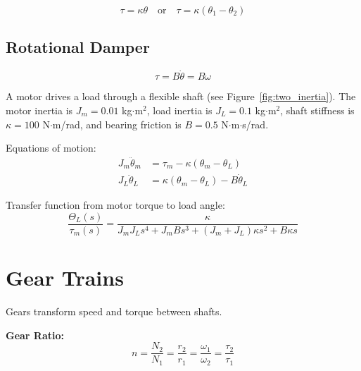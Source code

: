 \begin{equation}
\tau = \kappa\theta \quad \text{or} \quad \tau = \kappa(\theta_1 - \theta_2)
\end{equation}

\subsection{Rotational Damper}

\begin{equation}
\tau = B\dot{\theta} = B\omega
\end{equation}



\begin{examplebox}[title=Example 1.4: Rotating Shaft System]
A motor drives a load through a flexible shaft (see Figure~\ref{fig:two_inertia}). The motor inertia is $J_m = 0.01$ kg$\cdot$m$^2$, load inertia is $J_L = 0.1$ kg$\cdot$m$^2$, shaft stiffness is $\kappa = 100$ N$\cdot$m/rad, and bearing friction is $B = 0.5$ N$\cdot$m$\cdot$s/rad.

Equations of motion:
\begin{align}
J_m\ddot{\theta}_m &= \tau_m - \kappa(\theta_m - \theta_L) \\
J_L\ddot{\theta}_L &= \kappa(\theta_m - \theta_L) - B\dot{\theta}_L
\end{align}

Transfer function from motor torque to load angle:
\begin{equation}
\frac{\Theta_L(s)}{\tau_m(s)} = \frac{\kappa}{J_m J_L s^4 + J_m B s^3 + (J_m + J_L)\kappa s^2 + B\kappa s}
\end{equation}
\end{examplebox}

\section{Gear Trains}
\label{sec:gears}

Gears transform speed and torque between shafts.



\textbf{Gear Ratio:}
\begin{equation}
n = \frac{N_2}{N_1} = \frac{r_2}{r_1} = \frac{\omega_1}{\omega_2} = \frac{\tau_2}{\tau_1}
\end{equation}

